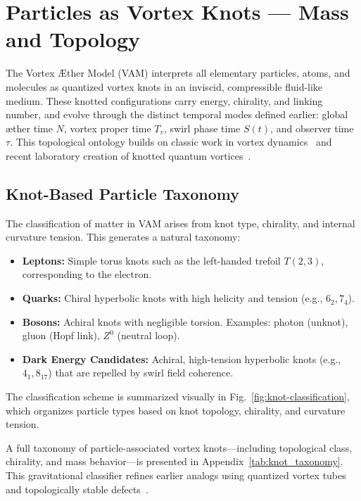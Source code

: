 \documentclass[12pt]{article}
\begin{document}
\section{Particles as Vortex Knots — Mass and Topology}

    The Vortex \AE{}ther Model (VAM) interprets all elementary particles, atoms, and molecules as quantized vortex knots in an inviscid, compressible fluid-like medium. These knotted configurations carry energy, chirality, and linking number, and evolve through the distinct temporal modes defined earlier: global æther time \( N \), vortex proper time \( T_v \), swirl phase time \( S(t) \), and observer time \( \tau \). This topological ontology builds on classic work in vortex dynamics~\cite{moffatt1969degree, arnold1998topological, saffman1992vortex} and recent laboratory creation of knotted quantum vortices~\cite{kleckner2013creation}.

    \subsection{Knot-Based Particle Taxonomy}

    The classification of matter in VAM arises from knot type, chirality, and internal curvature tension. This generates a natural taxonomy:

    \begin{itemize}
        \item \textbf{Leptons:} Simple torus knots such as the left-handed trefoil \( T(2,3) \), corresponding to the electron.
        \item \textbf{Quarks:} Chiral hyperbolic knots with high helicity and tension (e.g., \( 6_2, 7_4 \)).
        \item \textbf{Bosons:} Achiral knots with negligible torsion. Examples: photon (unknot), gluon (Hopf link), \( Z^0 \) (neutral loop).
        \item \textbf{Dark Energy Candidates:} Achiral, high-tension hyperbolic knots (e.g., \( 4_1, 8_{17} \)) that are repelled by swirl field coherence.
    \end{itemize}

    The classification scheme is summarized visually in Fig.~\ref{fig:knot-classification}, which organizes particle types based on knot topology, chirality, and curvature tension.

    A full taxonomy of particle-associated vortex knots—including topological class, chirality, and mass behavior—is presented in Appendix~\ref{tab:knot_taxonomy}. This gravitational classifier refines earlier analogs using quantized vortex tubes~\cite{volovik2003universe} and topologically stable defects~\cite{ranada1992knots}.
\end{document}
